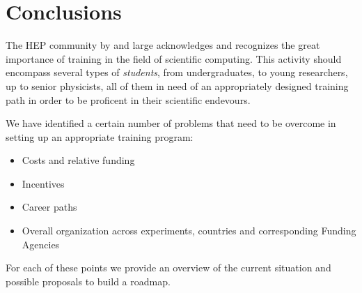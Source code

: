 \documentclass[12pt,a4paper]{article}
\begin{document}
\section{Conclusions}

The HEP community by and large acknowledges and recognizes the great importance
of training in the field of scientific computing. This activity should encompass
several types of {\it students}, from undergraduates, to young researchers, up
to senior physicists, all of them in need of an appropriately designed training
path in order to be proficent in their scientific endevours.

We have identified a certain number of problems that need to be overcome in
setting up an appropriate training program:
\begin{itemize}
    \item Costs and relative funding
    \item Incentives
    \item Career paths
    \item Overall organization across experiments, countries and 
    corresponding Funding Agencies
\end{itemize}

For each of these points we provide an overview of the current situation and possible proposals to build a roadmap.

%


\sloppy
\raggedright
\clearpage
\printbibliography[title={References},heading=bibintoc]

\printbibliography[title={references}]
\end{document}
